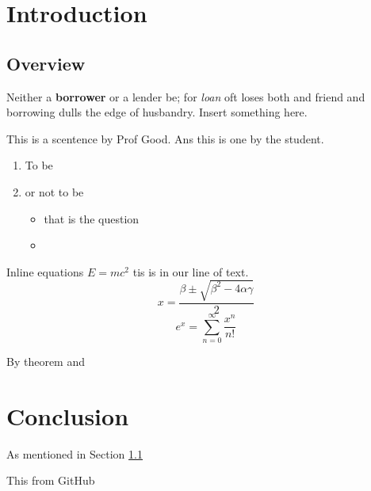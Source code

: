 \chapter{Introduction}

\section{Overview}
\label{Sec:Overview}

Neither a \textbf{borrower} or a lender be; for \textit{loan} oft loses both  and friend and borrowing dulls the edge of husbandry. Insert something here.

This is a scentence by Prof Good. Ans this is one by the student.

\begin{enumerate}
\item To be
\item or not to be
\begin{itemize}
\item that is the question
\item 
\end{itemize}
\end{enumerate}

Inline equations $E=mc^2$ tis is in our line of text.
\[
x = \frac{\beta\pm\sqrt{\beta^2-4\alpha\gamma}}{2}
\]
\[
e^x = \sum_{n=0}^\infty \frac{x^n}{n!}
\]

By theorem \cite{Bunce2003ThePreduals} and \cite[Section 3]{Edwards2003TheSpace}

\chapter{Conclusion}

As mentioned in Section \ref{Sec:Overview} 

This from GitHub

